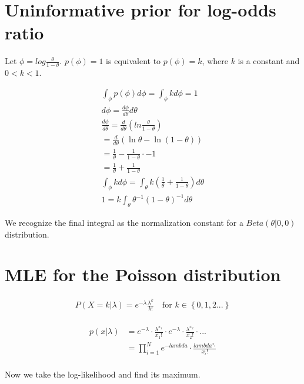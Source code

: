 \documentclass{article}
\begin{document}
\section{Uninformative prior for log-odds ratio}

Let $\phi = log \frac{\theta}{1-\theta}$. $p(\phi) = 1$ is equivalent
to $p(\phi) = k$, where $k$ is a constant and $0 < k < 1$.

\begin{gather*}
  \int_\phi p(\phi) d\phi = \int_\phi k d\phi = 1 \\
  d\phi = \frac{d\phi}{d\theta} d\theta \\
  \frac{d\phi}{d\theta} = \frac{d}{d\theta} \left( ln \frac{\theta}{1 - \theta} \right) \\
  = \frac{d}{d\theta} \left( \ln \theta - \ln (1 - \theta) \right) \\
  = \frac{1}{\theta} - \frac{1}{1 - \theta} \cdot -1 \\
  = \frac{1}{\theta} + \frac{1}{1 - \theta} \\
  \int_\phi k d\phi = \int_\theta k (\frac{1}{\theta} + \frac{1}{1 -
    \theta}) d\theta \\
  1 = k \int_\theta \theta^{-1} (1 - \theta)^{-1} d\theta
\end{gather*}

We recognize the final integral as the normalization constant for a
$Beta(\theta|0,0)$ distribution.

\section{MLE for the Poisson distribution}
\begin{gather*}
  P(X=k|\lambda) = e^{-\lambda}\frac{\lambda^{k}}{k!} \quad \text{for
  } k \in \left\{ 0,1,2... \right\} \\
\end{gather*}

\begin{align*}
  p(x|\lambda) &= e^{-\lambda} \cdot \frac{\lambda^{x_1}}{x_1!} \cdot
  e^{-\lambda} \cdot \frac{\lambda^{x_2}}{x_2!} \cdot ... \\
               &= \prod_{i=1}^N e^{-lambda} \cdot
                 \frac{lambda^{x_i}}{x_i!} \\
\end{align*}

Now we take the log-likelihood and find its maximum.
\end{document}
